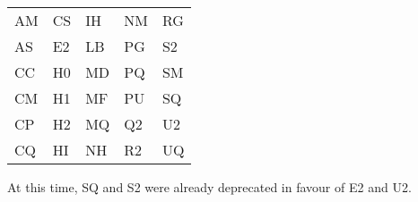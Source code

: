 \documentclass[10pt]{article}
\begin{document}
\begin{appendices}
\begin{center}
\begin{tabular}{l@{\qquad}l@{\qquad}l@{\qquad}l@{\qquad}l}
AM & CS & IH & NM & RG \\
AS & E2 & LB & PG & S2 \\
CC & H0 & MD & PQ & SM \\
CM & H1 & MF & PU & SQ \\
CP & H2 & MQ & Q2 & U2 \\
CQ & HI & NH & R2 & UQ
\end{tabular}
\end{center}

At this time, SQ and S2 were already deprecated in favour of E2 and U2.

\end{appendices}
\end{document}
